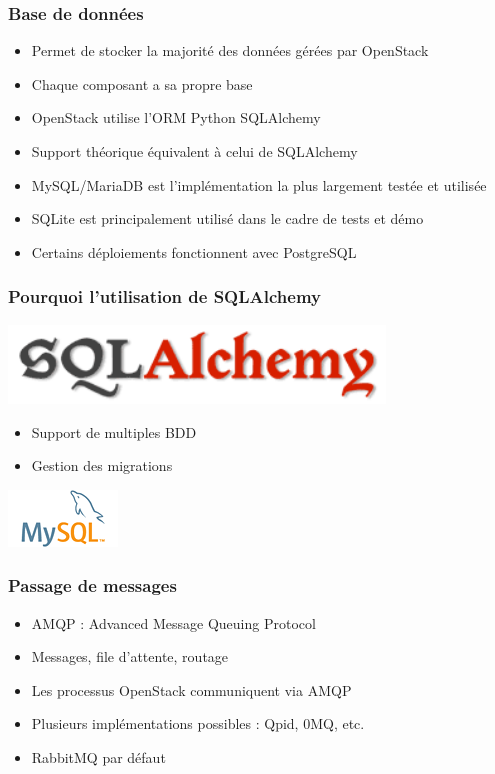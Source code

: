   \begin{frame}
    \frametitle{Base de données}
    \begin{itemize}
      \item Permet de stocker la majorité des données gérées par OpenStack
      \item Chaque composant a sa propre base
      \item OpenStack utilise l'ORM Python SQLAlchemy
      \item Support théorique équivalent à celui de SQLAlchemy
      \item MySQL/MariaDB est l'implémentation la plus largement testée et utilisée
      \item SQLite est principalement utilisé dans le cadre de tests et démo
      \item Certains déploiements fonctionnent avec PostgreSQL
    \end{itemize}
  \end{frame}

  \begin{frame}
    \frametitle{Pourquoi l'utilisation de SQLAlchemy}
    \begin{center}
      \includegraphics[width=10cm]{images/sqlalchemy-logo.png}
    \end{center}
    \begin{itemize}
      \item Support de multiples BDD
      \item Gestion des migrations
    \end{itemize}
    \begin{center}
      \includegraphics{images/mysql-logo.png}
    \end{center}
  \end{frame}

  \begin{frame}
    \frametitle{Passage de messages}
    \begin{itemize}
      \item AMQP : Advanced Message Queuing Protocol
      \item Messages, file d'attente, routage
      \item Les processus OpenStack communiquent via AMQP
      \item Plusieurs implémentations possibles : Qpid, 0MQ, etc.
      \item RabbitMQ par défaut
    \end{itemize}
  \end{frame}

